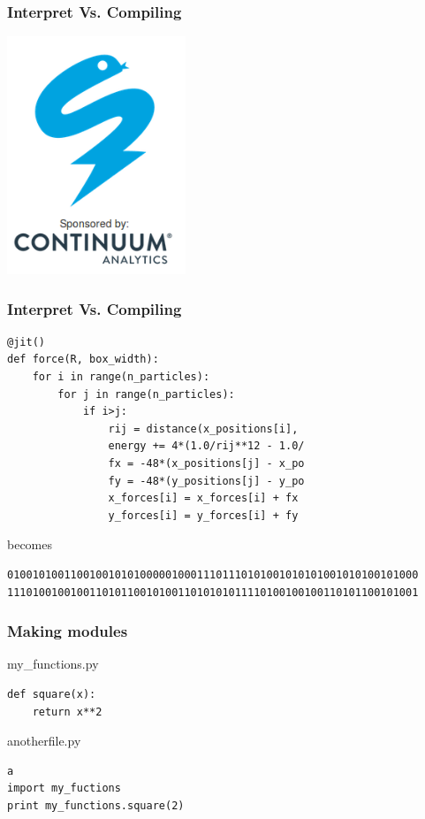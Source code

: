\begin{frame}[fragile]

    \frametitle{Interpret Vs. Compiling}
\begin{center}
 \includegraphics[width=0.4\textwidth]{images/numba.png}
\end{center} 
\end{frame}
 
\begin{frame}[fragile]

    \frametitle{Interpret Vs. Compiling}
    
\begin{lstlisting}
@jit()
def force(R, box_width):
    for i in range(n_particles):
        for j in range(n_particles):
            if i>j:
                rij = distance(x_positions[i],
                energy += 4*(1.0/rij**12 - 1.0/
                fx = -48*(x_positions[j] - x_po
                fy = -48*(y_positions[j] - y_po
                x_forces[i] = x_forces[i] + fx
                y_forces[i] = y_forces[i] + fy
\end{lstlisting}

    becomes

\begin{lstlisting}
01001010011001001010100000100011101110101001010101001010100101000
11101001001001101011001010011010101011110100100100110101100101001
\end{lstlisting}


\end{frame}


\begin{frame}[fragile]

    \frametitle{Making modules}

my\_functions.py
\begin{lstlisting}
def square(x):
    return x**2

\end{lstlisting}

\bigskip

anotherfile.py
\begin{lstlisting}a
import my_fuctions
print my_functions.square(2)
\end{lstlisting}

\end{frame}


